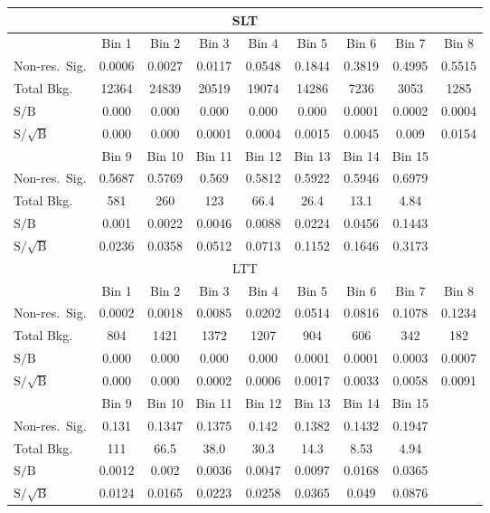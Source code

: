 \begin{tabular}{lcccccccc}
  \toprule
  \multicolumn{9}{c}{SLT} \\
    \midrule
  & Bin 1 & Bin 2 & Bin 3 & Bin 4 & Bin 5 & Bin 6   & Bin 7 & Bin 8\\
  \midrule
  Non-res.\ Sig. & 0.0006 & 0.0027 & 0.0117 & 0.0548 & 0.1844 & 0.3819 & 0.4995 & 0.5515\\
  Total Bkg. & 12364 & 24839 & 20519 & 19074 & 14286 & 7236 & 3053 & 1285 \\
  $\text{S} / \text{B}$ & 0.000 & 0.000 & 0.000 & 0.000 & 0.000 & 0.0001 & 0.0002   & 0.0004 \\
  $\text{S} / \sqrt{\text{B}}$ & 0.000 & 0.000 & 0.0001 & 0.0004 & 0.0015 & 0.0045 & 0.009   & 0.0154 \\

  \midrule
 & Bin 9 & Bin 10 & Bin 11 & Bin 12 & Bin 13 & Bin 14 & Bin 15&   \\
  \midrule
  Non-res.\ Sig. &  0.5687 & 0.5769 & 0.569 & 0.5812 & 0.5922 &0.5946&0.6979& \\
  Total Bkg.  & 581 & 260 & 123 & 66.4  & 26.4 &13.1&4.84& \\
  $\text{S} / \text{B}$   & 0.001   & 0.0022   & 0.0046   & 0.0088 & 0.0224& 0.0456& 0.1443&\\
  $\text{S} / \sqrt{\text{B}}$   & 0.0236   & 0.0358   & 0.0512   & 0.0713 &  0.1152 &0.1646&0.3173&\\


  \midrule
    \multicolumn{9}{c}{LTT} \\
    \midrule
  & Bin 1 & Bin 2 & Bin 3 & Bin 4 & Bin 5 & Bin 6   & Bin 7 & Bin 8\\
  \midrule
  Non-res.\ Sig. & 0.0002 & 0.0018 & 0.0085 & 0.0202& 0.0514 & 0.0816 & 0.1078 & 0.1234\\
  Total Bkg. & 804 & 1421 & 1372 & 1207 & 904 & 606 & 342 & 182 \\
  $\text{S} / \text{B}$ & 0.000 & 0.000 & 0.000 & 0.000 & 0.0001 & 0.0001 & 0.0003   & 0.0007 \\
  $\text{S} / \sqrt{\text{B}}$ & 0.000 & 0.000 & 0.0002 & 0.0006 & 0.0017 & 0.0033 & 0.0058   & 0.0091 \\
  
    \midrule
 & Bin 9 & Bin 10 & Bin 11 & Bin 12 & Bin 13 & Bin 14 & Bin 15&   \\
  \midrule
  Non-res.\ Sig. &  0.131 & 0.1347 & 0.1375 & 0.142 & 0.1382 &0.1432&0.1947& \\
  Total Bkg.  & 111 & 66.5 & 38.0 & 30.3  & 14.3 &8.53&4.94& \\
  $\text{S} / \text{B}$   & 0.0012   & 0.002   & 0.0036   & 0.0047 & 0.0097& 0.0168& 0.0365&\\
  $\text{S} / \sqrt{\text{B}}$   & 0.0124   & 0.0165   & 0.0223   & 0.0258 &  0.0365 &0.049&0.0876&\\
  
  \bottomrule
\end{tabular}

